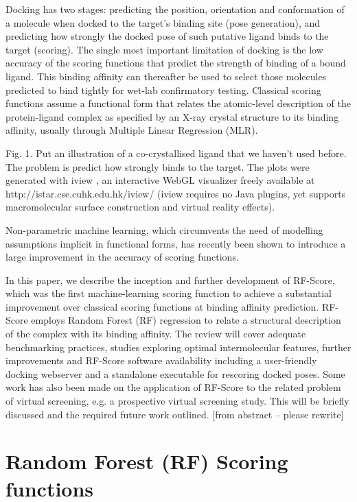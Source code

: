 \documentclass{llncs}
\begin{document}
Docking has two stages: predicting the position, orientation and conformation of a molecule when docked to the target's binding site (pose generation), and predicting how strongly the docked pose of such putative ligand binds to the target (scoring). The single most important limitation of docking is the low accuracy of the scoring functions that predict the strength of binding of a bound ligand. This binding affinity can thereafter be used to select those molecules predicted to bind tightly for wet-lab confirmatory testing. Classical scoring functions \cite{1313} assume a functional form that relates the atomic-level description of the protein-ligand complex as specified by an X-ray crystal structure to its binding affinity, usually through Multiple Linear Regression (MLR).

Fig. 1. Put an illustration of a co-crystallised ligand that we haven’t used before. The problem is predict how strongly binds to the target. The plots were generated with iview \cite{1366}, an interactive WebGL visualizer freely available at http://istar.cse.cuhk.edu.hk/iview/ (iview requires no Java plugins, yet supports macromolecular surface construction and virtual reality effects).

Non-parametric machine learning, which circumvents the need of modelling assumptions implicit in functional forms, has recently been shown \cite{564,908} to introduce a large improvement in the accuracy of scoring functions. 

In this paper, we describe the inception and further development of RF-Score, which was the first machine-learning scoring function to achieve a substantial improvement over classical scoring functions at binding affinity prediction. RF-Score employs Random Forest (RF) regression to relate a structural description of the complex with its binding affinity. The review will cover adequate benchmarking practices, studies exploring optimal intermolecular features, further improvements and RF-Score software availability including a user-friendly docking webserver and a standalone executable for rescoring docked poses. Some work has also been made on the application of RF-Score to the related problem of virtual screening, e.g. a prospective virtual screening study. This will be briefly discussed and the required future work outlined. [from abstract – please rewrite]

\section{Random Forest (RF) Scoring functions}
\end{document}
